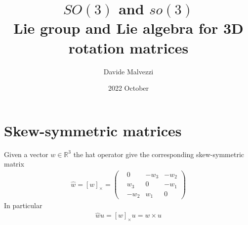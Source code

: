 \documentclass{report}
\title{$SO(3)$ and $so(3)$ \cite{slides}\\
    \large Lie group and Lie algebra for 3D rotation matrices
}
\date{2022 October}
\author{Davide Malvezzi}
\begin{document}
\maketitle

\section{Skew-symmetric matrices}
\noindent Given a vector $w \in \mathbb{R}^3$ the hat operator give the corresponding skew-symmetric matrix
\begin{align}
    \hat{w} = \left[ w \right]_{\times} = 
    \left(
    \begin{matrix}
        &0 &-w_3 &-w_2 \\   
        &w_3 &0 &-w_1 \\
        &-w_2 &w_1 &0
    \end{matrix}
    \right)
\end{align}
In particular
\begin{align}
    \hat{w}u = \left[ w \right]_{\times} u = w {\times} u
\end{align}
\end{document}
